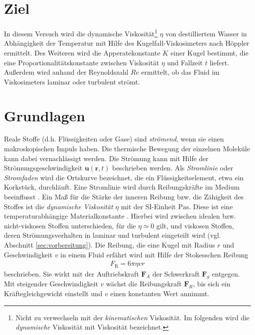 \section{Ziel}
In diesem Versuch wird die dynamische Viskosität\footnote{ Nicht zu verwechseln mit der \textit{kinematischen} Viskosität.
Im folgenden wird die \textit{dynamische} Viskosität mit Viskosität bezeichnet.} $\eta$ 
von destilliertem Wasser in Abhängigkeit der Temperatur mit Hilfe des Kugelfall-Viskosimeters nach Höppler ermittelt.
Des Weiteren wird die Apperatekonstante $K$ einer Kugel bestimmt, die eine Proportionalitätskonstante zwischen Viskosität $\eta$ und Fallzeit $t$ liefert.
Außerdem wird anhand der Reynoldszahl $Re$ ermittelt, ob das Fluid im Viskosimeters laminar oder turbulent strömt. 



\section{Grundlagen}
\label{sec:grundlagen}
Reale Stoffe (d.h. Flüssigkeiten oder Gase) sind \textit{strömend}, wenn sie einen makroskopischen Impuls haben.
Die thermische Bewegung der einzelnen Moleküle kann dabei vernachlässigt werden.
Die Strömung kann mit Hilfe der Strömungsgeschwindigkeit $\symbf{u}\left(\symbf{r},t\right)$ beschrieben werden.
Als \textit{Stromlinie} oder \textit{Stromfaden} wird die Ortskurve bezeichnet, die ein Flüssigkeitselement, etwa ein Korkstück, durchläuft.
Eine Stromlinie wird durch Reibungskräfte im Medium beeinflusst \cite[]{demtroeder}.
Ein Maß für die Stärke der inneren Reibung bzw. die Zähigkeit des Stoffes ist die \textit{dynamische Viskosität} $\eta$ mit der SI-Einheit $\unit{\Pa \s}$.
Diese ist eine temperaturabhängige Materialkonstante \cite[]{geschke}.
Hierbei wird zwischen idealen bzw. nicht-viskosen Stoffen unterschieden, für die $\eta \simeq 0$ gilt, und viskosen Stoffen,
deren Strömungsverhalten in laminar und turbulent eingeteilt wird (vgl. Abschnitt \ref{sec:vorbereitung}).
\noindent
Die Reibung, die eine Kugel mit Radius $r$ und Geschwindigkeit $v$ in einem Fluid erfährt wird mit Hilfe der Stokesschen Reibung 
\noindent
\begin{align}
    F_\text{R} = 6 \pi \eta v r    
\end{align}
\noindent
beschrieben.
Sie wirkt mit der Auftriebskraft $\symbf{F}_A$ der Schwerkraft $\symbf{F}_g$ entgegen. 
Mit steigender Geschwindigkeit $v$ wächst die Reibungskraft $\symbf{F}_R$, bis sich ein Kräftegleichgewicht einstellt
und $v$ einen konstanten Wert annimmt.
